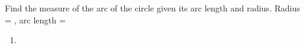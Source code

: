 Find the measure of the arc of the circle given its arc length and radius.
\newline
Radius = , arc length = 
\newline
\begin{enumerate}
    \item
\end{enumerate}
